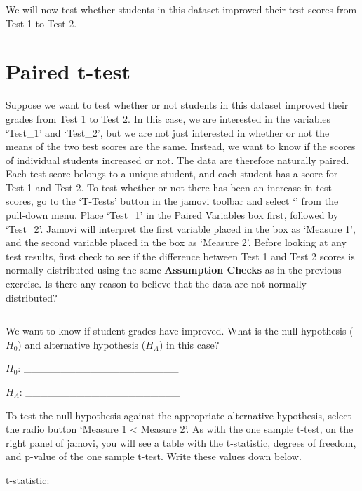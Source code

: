 \documentclass[
  openany]{krantz}
\begin{document}
We will now test whether students in this dataset improved their test scores from Test 1 to Test 2.

\hypertarget{paired-t-test}{%
\section{Paired t-test}\label{paired-t-test}}

Suppose we want to test whether or not students in this dataset improved their grades from Test 1 to Test 2.
In this case, we are interested in the variables `Test\_1' and `Test\_2', but we are not just interested in whether or not the means of the two test scores are the same.
Instead, we want to know if the scores of individual students increased or not.
The data are therefore naturally paired.
Each test score belongs to a unique student, and each student has a score for Test 1 and Test 2.
To test whether or not there has been an increase in test scores, go to the `T-Tests' button in the jamovi toolbar and select `' from the pull-down menu.
Place `Test\_1' in the Paired Variables box first, followed by `Test\_2'.
Jamovi will interpret the first variable placed in the box as `Measure 1', and the second variable placed in the box as `Measure 2'.
Before looking at any test results, first check to see if the difference between Test 1 and Test 2 scores is normally distributed using the same \textbf{Assumption Checks} as in the previous exercise.
Is there any reason to believe that the data are not normally distributed?

\begin{verbatim}
\end{verbatim}

We want to know if student grades have improved.
What is the null hypothesis (\(H_{0}\)) and alternative hypothesis (\(H_{A}\)) in this case?

\(H_{0}\): \_\_\_\_\_\_\_\_\_\_\_\_\_\_\_\_\_\_\_\_\_

\(H_{A}\): \_\_\_\_\_\_\_\_\_\_\_\_\_\_\_\_\_\_\_\_\_

To test the null hypothesis against the appropriate alternative hypothesis, select the radio button `Measure 1 \textless{} Measure 2'.
As with the one sample t-test, on the right panel of jamovi, you will see a table with the t-statistic, degrees of freedom, and p-value of the one sample t-test.
Write these values down below.

t-statistic: \_\_\_\_\_\_\_\_\_\_\_\_\_\_\_\_\_
\end{document}
